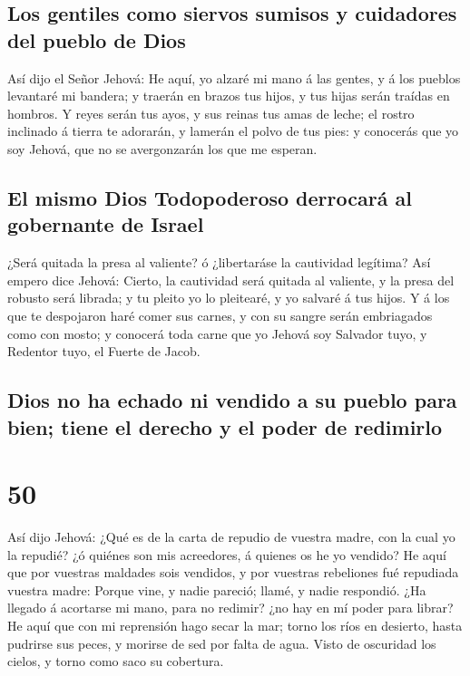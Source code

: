 \hypertarget{los-gentiles-como-siervos-sumisos-y-cuidadores-del-pueblo-de-dios}{%
\subsection{Los gentiles como siervos sumisos y cuidadores del pueblo de
Dios}\label{los-gentiles-como-siervos-sumisos-y-cuidadores-del-pueblo-de-dios}}

 Así dijo el Señor Jehová: He aquí, yo alzaré mi mano á las
gentes, y á los pueblos levantaré mi bandera; y traerán en brazos tus
hijos, y tus hijas serán traídas en hombros.  Y reyes serán
tus ayos, y sus reinas tus amas de leche; el rostro inclinado á tierra
te adorarán, y lamerán el polvo de tus pies: y conocerás que yo soy
Jehová, que no se avergonzarán los que me esperan.

\hypertarget{el-mismo-dios-todopoderoso-derrocaruxe1-al-gobernante-de-israel}{%
\subsection{El mismo Dios Todopoderoso derrocará al gobernante de
Israel}\label{el-mismo-dios-todopoderoso-derrocaruxe1-al-gobernante-de-israel}}

 ¿Será quitada la presa al valiente? ó ¿libertaráse la
cautividad legítima?  Así empero dice Jehová: Cierto, la
cautividad será quitada al valiente, y la presa del robusto será
librada; y tu pleito yo lo pleitearé, y yo salvaré á tus hijos.
 Y á los que te despojaron haré comer sus carnes, y con su
sangre serán embriagados como con mosto; y conocerá toda carne que yo
Jehová soy Salvador tuyo, y Redentor tuyo, el Fuerte de Jacob.

\hypertarget{dios-no-ha-echado-ni-vendido-a-su-pueblo-para-bien-tiene-el-derecho-y-el-poder-de-redimirlo}{%
\subsection{Dios no ha echado ni vendido a su pueblo para bien; tiene el
derecho y el poder de
redimirlo}\label{dios-no-ha-echado-ni-vendido-a-su-pueblo-para-bien-tiene-el-derecho-y-el-poder-de-redimirlo}}

\hypertarget{section-49}{%
\section{50}\label{section-49}}

 Así dijo Jehová: ¿Qué es de la carta de repudio de vuestra
madre, con la cual yo la repudié? ¿ó quiénes son mis acreedores, á
quienes os he yo vendido? He aquí que por vuestras maldades sois
vendidos, y por vuestras rebeliones fué repudiada vuestra madre:
 Porque vine, y nadie pareció; llamé, y nadie respondió. ¿Ha
llegado á acortarse mi mano, para no redimir? ¿no hay en mí poder para
librar? He aquí que con mi reprensión hago secar la mar; torno los ríos
en desierto, hasta pudrirse sus peces, y morirse de sed por falta de
agua.  Visto de oscuridad los cielos, y torno como saco su
cobertura.

